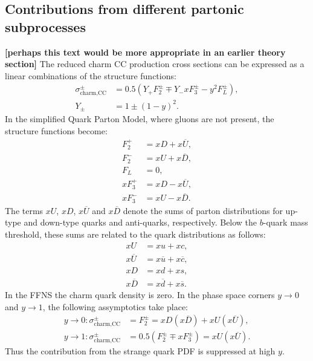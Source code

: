 \documentclass[pdftex,twocolumn,epjc3]{svjour3}          %
\begin{document}
\subsection{Contributions from different partonic subprocesses}
\label{sec:thpred-partonic}

{\bf [perhaps this text would be more appropriate in an earlier theory section]}
The reduced charm CC production cross sections can be expressed as a linear combinations of the structure functions:
\begin{equation}
\begin{split}
    \sigma^{\pm}_{\text{charm,CC}} &= 0.5(Y_{+}F_2^{\pm} \mp Y_{-}xF_3^{\pm} - y^2F_L^{\pm}),\\
    Y_{\pm} &= 1 \pm (1-y)^2.
\end{split}
\end{equation}
In the simplified Quark Parton Model, where gluons are not present, the structure functions become:
\begin{equation}
\begin{split}
    F_2^{+} &= xD + x\overline{U}, \\
    F_2^{-} &= xU + x\overline{D},\\
    F_L &= 0,\\
    xF_3^{+} &= xD - x\overline{U}, \\
    xF_3^{-} &= xU - x\overline{D}.
\end{split}
\end{equation}
The terms $xU$, $xD$, $x\overline{U}$ and $x\overline{D}$ denote the sums of parton distributions for up-type and down-type quarks and anti-quarks, respectively. 
Below the $b$-quark mass threshold, these sums are related to the quark distributions as follows:
\begin{equation}
\begin{split}
 xU &= xu + xc , \\
 x\overline{U} &= x\overline{u} + x\overline{c} , \\
 xD &= xd + xs , \\
 x\overline{D} &= x\overline{d} + x\overline{s}.
\end{split}
\end{equation}
In the FFNS the charm quark density is zero.
In the phase space corners $y \to 0$ and $y \to 1$, the following assymptotics take place:
\begin{equation}
\begin{split}
 y \to 0: \sigma^{\pm}_{\text{charm,CC}} &= F_2^{\pm} = xD(x\overline{D}) + xU(x\overline{U}), \\
 y \to 1: \sigma^{\pm}_{\text{charm,CC}} &= 0.5(F_2^{\pm} \mp xF_3^{\pm}) = xU (x\overline{U}).
\label{eq:y01}
\end{split}
\end{equation}
Thus the contribution from the strange quark PDF is suppressed at high $y$.
\end{document}
